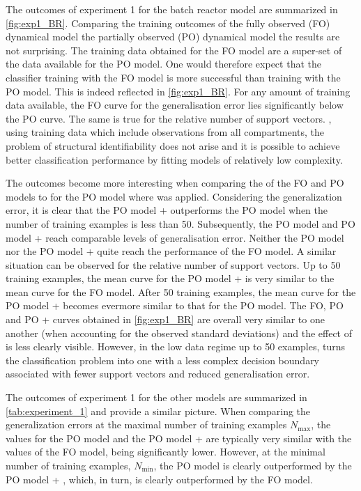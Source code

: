 The outcomes of experiment 1 for the batch reactor model are summarized in \autoref{fig:exp1_BR}.
Comparing the training outcomes of the fully observed (FO) dynamical model  the partially observed (PO) dynamical model\eco{,} the results are not surprising.
The training data obtained for the FO model are a super-set of the data available for the PO model.
One would therefore expect that the classifier training with the FO model is more successful than training with the PO model.
This is indeed reflected in \autoref{fig:exp1_BR}. 
For any amount of training data available, the FO curve for the generalisation error lies significantly below the PO curve.
The same is true for the relative number of support vectors.
, using training data which include observations from all compartments, the problem of structural identifiability 
does not arise and it is possible to achieve better classification performance by fitting models of relatively low complexity.

The outcomes become more interesting when comparing the  of the FO and PO models to  for the PO model where \myMethod{} was applied. 
Considering the generalization error, it is clear that the PO model + \myMethod{} outperforms the PO model   when the number of training examples is less than 50.
Subsequently, the PO model and PO model + \myMethod{} reach comparable levels of generalisation error.
Neither the PO model nor the PO model + \myMethod{} quite reach the performance of the FO model.
A similar situation can be observed for the relative number of support vectors.
Up to 50 training examples, the mean curve for the PO model + \myMethod{} is very similar to the mean curve for the FO model.
After 50 training examples, the mean curve for the PO model + \myMethod{} becomes evermore  similar to that for the PO model.
The FO, PO and PO + \myMethod{} curves obtained  in \autoref{fig:exp1_BR} are overall very similar to one another (when accounting for the observed standard deviations) and the effect of \myMethod{} is less clearly visible.
However, in the low data regime up to 50 examples, \myMethod{} turns the classification problem into one with a less complex decision boundary associated with fewer support vectors and reduced generalisation error.

The outcomes of experiment 1 for the other models are summarized in \autoref{tab:experiment_1} and provide a similar picture.
When comparing the generalization errors at the maximal number of training examples $N_{\max}$, the values for the PO model and the PO model + \myMethod{} are typically very similar with the values of the FO model, being significantly lower.
However, at the minimal number of training examples, $N_{\min}$, the PO model is clearly outperformed by the PO model + \myMethod{}, which, in turn, is clearly outperformed by the FO model.


